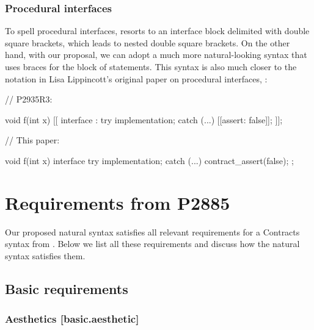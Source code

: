 \subsubsection{Procedural interfaces}
\label{subsubsec:comp_interfaces}

To spell procedural interfaces, \cite{P2935R3} resorts to an interface block delimited with double square brackets, which leads to nested double square brackets. On the other hand, with our proposal, we can adopt a much more natural-looking syntax that uses braces for the block of statements. This syntax is also much closer to the notation in Lisa Lippincott's original paper on procedural interfaces, \cite{P0465R0}:

\begin{minipage}{8cm}
\begin{codeblock}
// P2935R3:

void f(int x)
  [[ interface :
    try {
      implementation;
    }
    catch (...) {
      [[assert: false]];
    }
  ]];
\end{codeblock}
\end{minipage}
\begin{minipage}{8cm}
\begin{codeblock}
// This paper:

void f(int x)
interface {
  try {
    implementation;
  }
  catch (...) {
    contract_assert(false);
  }
};
\end{codeblock}
\end{minipage}



\section{Requirements from P2885}
\label{sec:requirements}

Our proposed natural syntax satisfies all relevant requirements for a Contracts syntax from \cite{P2885R3}. Below we list all these requirements and discuss how the natural syntax satisfies them.

\subsection{Basic requirements}

\subsubsection{Aesthetics  [basic.aesthetic]}


